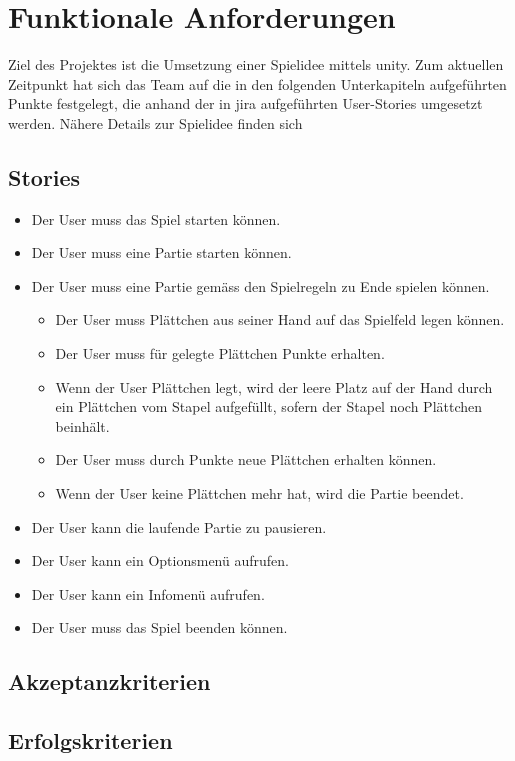 \documentclass[../main.tex]{subfiles}
\begin{document}
    \section{Funktionale Anforderungen}
    Ziel des Projektes ist die Umsetzung einer Spielidee mittels \gls{unity}. Zum aktuellen Zeitpunkt hat sich das Team auf die in den folgenden Unterkapiteln aufgeführten Punkte festgelegt, die anhand der in \gls{jira} aufgeführten User-Stories umgesetzt werden. Nähere Details zur Spielidee finden sich 
    \subsection{Stories}
    \begin{itemize}
    	\item Der User muss das Spiel starten können.
    	\item Der User muss eine Partie starten können.
    	\item Der User muss eine Partie gemäss den Spielregeln zu Ende spielen können.
    	\begin{itemize}
    		\item Der User muss Plättchen aus seiner Hand auf das Spielfeld legen können.
    		\item Der User muss für gelegte Plättchen Punkte erhalten.
    		\item Wenn der User Plättchen legt, wird der leere Platz auf der Hand durch ein Plättchen vom Stapel aufgefüllt, sofern der Stapel noch Plättchen beinhält.
    		\item Der User muss durch Punkte neue Plättchen erhalten können.
    		\item Wenn der User keine Plättchen mehr hat, wird die Partie beendet.
    	\end{itemize}
    	\item Der User kann die laufende Partie zu pausieren.
    	\item Der User kann ein Optionsmenü aufrufen.
    	\item Der User kann ein Infomenü aufrufen.
    	\item Der User muss das Spiel beenden können.
    \end{itemize}
	\par {}

	\subsection{Akzeptanzkriterien}

	\subsection{Erfolgskriterien}
\end{document}

